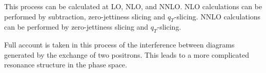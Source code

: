 This process can be calculated at LO, NLO, and NNLO.
NLO calculations can be performed by subtraction, zero-jettiness slicing and $q_T$-slicing.
NNLO calculations can be performed by  zero-jettiness slicing and $q_T$-slicing.

Full account is taken in this process of the interference between diagrams
generated by the exchange of two positrons. This leads to a more complicated resonance
structure in the phase space.
